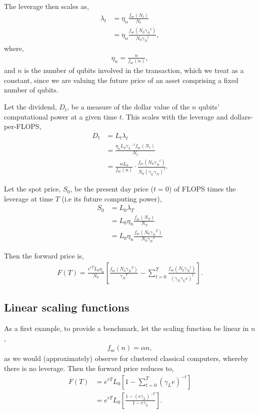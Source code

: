 \documentclass[aps,pra,twocolumn,amsmath,amssymb,nofootinbib,superscriptaddress]{revtex4}
\begin{document}
The leverage then scales as,
\begin{align}
\lambda_t &= \eta_n \frac{f_\text{sc}(N_t)}{N_t} \nonumber \\
&= \eta_n \frac{f_\text{sc}(N_0 {\gamma_N}^{t})}{N_0 {\gamma_N}^{t}},
\end{align}
where,
\begin{align}
	\eta_n = \frac{n}{f_\text{sc}(n)},
\end{align}
and $n$ is the number of qubits involved in the transaction, which we treat as a constant, since we are valuing the future price of an asset comprising a fixed number of qubits.

Let the dividend, $D_t$, be a measure of the dollar value of the $n$ qubits' computational power at a given time $t$. This scales with the leverage and dollars-per-FLOPS,
\begin{align}
D_t &= L_t \lambda_t \nonumber \\
&= \frac{\eta_n L_0 {\gamma_L}^{-t} f_\text{sc}(N_t)}{N_t} \nonumber \\
&= \frac{nL_0}{f_\text{sc}(n)} \cdot \frac{f_\text{sc}(N_0 {\gamma_N}^{t})}{N_0(\gamma_L\gamma_N)^{t}}.
\end{align}

Let the spot price, $S_0$, be the present day price ($t=0$) of FLOPS times the leverage at time $T$ (i.e its future computing power),
\begin{align}
S_0 &= L_0 \lambda_T \nonumber \\
&= L_0 \eta_n \frac{f_\text{sc}(N_T)}{N_T} \nonumber \\
&= L_0 \eta_n \frac{f_\text{sc}(N_0 {\gamma_N}^{T})}{N_0 {\gamma_N}^{T}}
\end{align}

Then the forward price is,
\begin{align}
F(T) = \frac{e^{rT}L_0\eta_n}{N_0} \left[ \frac{f_\text{sc}(N_0 {\gamma_N}^{T})}{{\gamma_N}^{T}} - \sum_{t=0}^{T} \frac{f_\text{sc}(N_0 {\gamma_N}^{t})}{(\gamma_N \gamma_L e)^{t}} \right].
\end{align}

\subsection{Linear scaling functions}

As a first example, to provide a benchmark, let the scaling function be linear in $n$,
\begin{align}
f_\text{sc}(n) = \alpha n,	
\end{align}
as we would (approximately) observe for clustered classical computers, whereby there is no leverage. Then the forward price reduces to,
\begin{align}
F(T) &= {e^{rT}L_0} \left[1 - \sum_{t=0}^{T} (\gamma_L e)^{-t} \right] \nonumber \\
&= {e^{rT}L_0} \left[\frac{1-(e\gamma_L)^{-T}}{1-e\gamma_L} \right].
\end{align}
\end{document}
